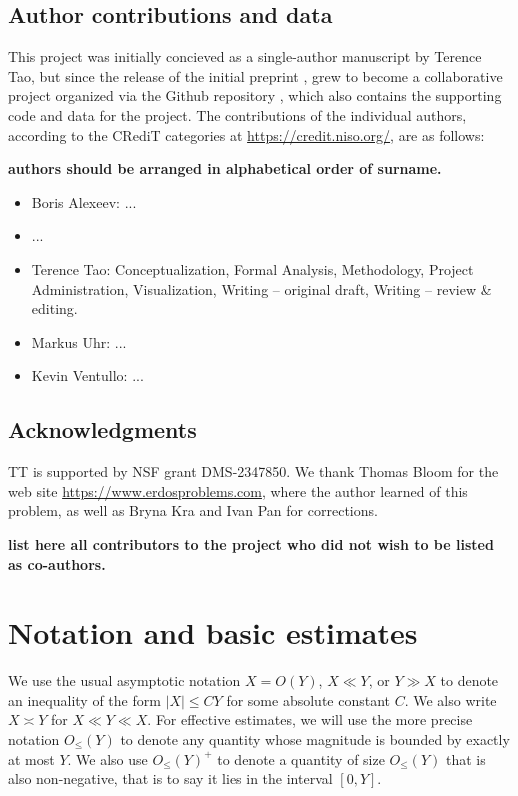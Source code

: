 \documentclass[12pt,a4paper,reqno]{amsart}
\numberwithin{equation}{section}
\theoremstyle{plain}
\theoremstyle{definition}
\begin{document}
\subsection{Author contributions and data}

This project was initially concieved as a single-author manuscript by Terence Tao, but since the release of the initial preprint \cite{tao}, grew to become a collaborative project organized via the Github repository \cite{github}, which also contains the supporting code and data for the project.  The contributions of the individual authors, according to the CRediT categories at \url{https://credit.niso.org/}, are as follows:

{\bf authors should be arranged in alphabetical order of surname.  }

\begin{itemize}
\item Boris Alexeev: ...
\item ...
\item Terence Tao: Conceptualization, Formal Analysis, Methodology, Project Administration, Visualization, Writing -- original draft, Writing -- review \& editing.
\item Markus Uhr: ...
\item Kevin Ventullo: ...
\end{itemize}

\subsection{Acknowledgments}

TT is supported by NSF grant DMS-2347850.  We thank Thomas Bloom for the web site \url{https://www.erdosproblems.com}, where the author learned of this problem, as well as Bryna Kra and Ivan Pan for  corrections.

{\bf list here all contributors to the project who did not wish to be listed as co-authors.}


\section{Notation and basic estimates}

We use the usual asymptotic notation $X = O(Y)$, $X \ll Y$, or $Y \gg X$ to denote an inequality of the form $|X| \leq CY$ for some absolute constant $C$.  We also write $X \asymp Y$ for $X \ll Y \ll X$. For effective estimates, we will use the more precise notation $O_{\leq}(Y)$ to denote any quantity whose magnitude is bounded by exactly at most $Y$. We also use $O_{\leq}(Y)^+$ to denote a quantity of size $O_{\leq}(Y)$ that is also non-negative, that is to say it lies in the interval $[0,Y]$.
\end{document}
